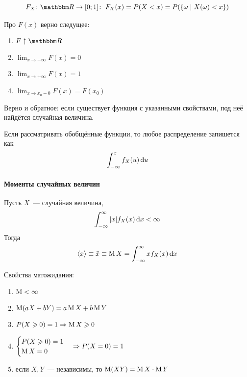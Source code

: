 \documentclass[12pt,timbord]{../../../notes}
\begin{document}
\begin{defn}\label{defn:prob::randscal::distrfun}
  \[
    F_X\colon \R\to [0;1] \colon\; F_X(x) = P(X < x) = P(\{\omega \mid X(\omega) < x \})
  \]
\end{defn}

\begin{prop}\label{prop:prob::randscal::distrfun}
  Про $F(x)$ верно следущее:
  \begin{enumerate}
    \item $F\displaystyle\uparrow \R$
    \item $\displaystyle\lim_{x\to -\infty}F(x) = 0$
    \item $\displaystyle\lim_{x\to +\infty}F(x) = 1$
    \item $\displaystyle\lim_{x\to x_0-0}F(x) = F(x_0)$
  \end{enumerate}
\end{prop}

\begin{prop}\label{prop:prob::randscal::inv}
  Верно и обратное: если существует функция с  указанными свойствами, под неё найдётся случайная
  величина. 
\end{prop}

\begin{rem*}\label{rem*:prob::randscal::delta}
  Если рассматривать обобщённые функции, то любое распределение запишется как
  \[
    \int_{-\infty}^x f_X(u)\,\mathrm{d} u
  \]
\end{rem*}
\paragraph{Моменты случайных величин}
\label{par:prob::moments}

\begin{defn}\label{defn:prob::moments::exp}
  Пусть $X$~--- случайная величина, \[
    \int_{-\infty}^{\infty} |x| f_X(x)\, \mathrm{d} x < \infty 
  \]
  Тогда 
  \[
    \langle x \rangle \equiv \bar x \equiv \operatorname{M} X = \int_{-\infty}^{\infty} x f_X(x)\, \mathrm{d} x
  \]
\end{defn}

\begin{prop}\label{prop:prob::moments::expprop}
  Свойства матожидания:
  \begin{enumerate}
    \item $\operatorname{M} < \infty$
    \item $\operatorname{M}(a X + b Y) = a\operatorname{M} X + b\operatorname{M} Y$
    \item $P(X \geqslant 0) = 1 \Rightarrow \operatorname{M} X \geqslant 0 $
    \item $\begin{cases}
      P(X \geqslant 0) = 1 \\
      \operatorname{M} X = 0
    \end{cases}\Rightarrow P(X= 0) =1  $
    \item если $X,Y$~--- независимы, то $\operatorname{M} (XY) = \operatorname{M} X \cdot \operatorname{M} Y$
  \end{enumerate}
\end{prop}
\end{document}

